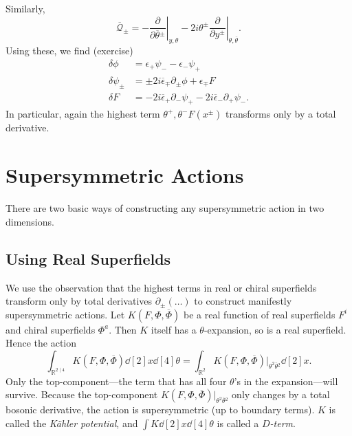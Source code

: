 Similarly, 
\begin{equation}
  \overline{\mathcal{Q}}{}_{\pm} = - \left.\frac{\partial }{\partial \overline{\theta}{}^{\pm}} \right\rvert_{y, \theta} - 2 i \theta^{\pm} \left. \frac{\partial }{\partial y^{\pm}} \right\rvert_{\theta, \overline{\theta}{}}.
\end{equation}
Using these, we find (exercise)
\begin{align}
  \delta \phi &= \epsilon_+ \psi_- - \epsilon_- \psi_+ \\
  \delta \psi_{\pm} &= \pm 2 i \overline{\epsilon}{}_{\mp} \partial_{\pm} \phi + \epsilon_{\mp} F \\
  \delta F &= -2 i \overline{\epsilon}{}_{+} \partial_- \psi_+ - 2 i \overline{\epsilon}{}_- \partial_+ \psi_-.
\end{align}
In particular, again the highest term $\theta^+, \theta^- F(x^{\pm})$ transforms only by a total derivative.

\section{Supersymmetric Actions}%
\label{sec:supersymmetric_actions}

There are two basic ways of constructing any supersymmetric action in two dimensions.

\subsection{Using Real Superfields}%
\label{sub:using_real_superfields}

We use the observation that the highest terms in real or chiral superfields transform only by total derivatives $\partial_{\pm} ( \dots )$ to construct manifestly supersymmetric actions.
Let $K(F, \Phi, \overline{\Phi}{})$ be a real function of real superfields $F^i$ and chiral superfields $\Phi^a$.
Then $K$ itself has a $\theta$-expansion, so is a real superfield.
Hence the action
\begin{equation}
  \int_{\mathbb{R}^{2 \mid 4}} K(F, \Phi, \overline{\Phi}{}) \dd[2]{x} \dd[4]{\theta} = \int_{\mathbb{R}^2} K(F, \Phi, \overline{\Phi}{}) \rvert_{\theta^2 \overline{\theta}{}^2} \dd[2]{x}.
\end{equation}
Only the top-component---the term that has all four $\theta$'s in the expansion---will survive.
Because the top-component $K(F, \Phi, \overline{\Phi}{})\rvert_{\theta^2 \overline{\theta}{}^2}$ only changes by a total bosonic derivative, the action is supersymmetric (up to boundary terms).
$K$ is called the \emph{Kähler potential}, and $\int K \dd[2]{x} \dd[4]{\theta}$ is called a \emph{$D$-term}.

